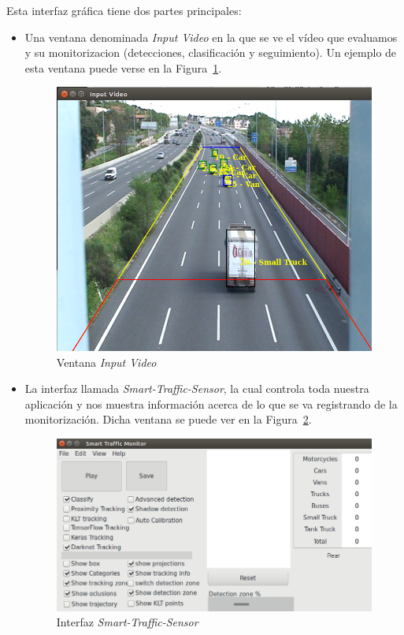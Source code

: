 Esta interfaz gráfica tiene dos partes principales:
\begin{itemize}
    \item Una ventana denominada \textit{Input Video} en la que se ve el vídeo que evaluamos y su monitorizacion (detecciones, clasificación y seguimiento). Un ejemplo de esta ventana puede verse en la Figura~\ref{fig.input_video}.
     \begin{figure}[H] 
    \begin{center}
    	\includegraphics[scale=0.4]{figures/Diseno_global/sts_buena.png}
       \caption{Ventana \textit{Input Video}}
    	\label{fig.input_video}
    \end{center}
    \end{figure}
    \item La interfaz llamada \textit{Smart-Traffic-Sensor}, la cual controla toda nuestra aplicación y nos muestra información acerca de lo que se va registrando de la monitorización. Dicha ventana se puede ver en la Figura~\ref{fig.interfaz_sts}.
     \begin{figure}[H] 
    \begin{center}
    	\includegraphics[scale=0.5]{figures/Diseno_global/interfaz_grafica.png}
       \caption{Interfaz \textit{
       Smart-Traffic-Sensor}}
    	\label{fig.interfaz_sts}
    \end{center}
    \end{figure}
\end{itemize}

